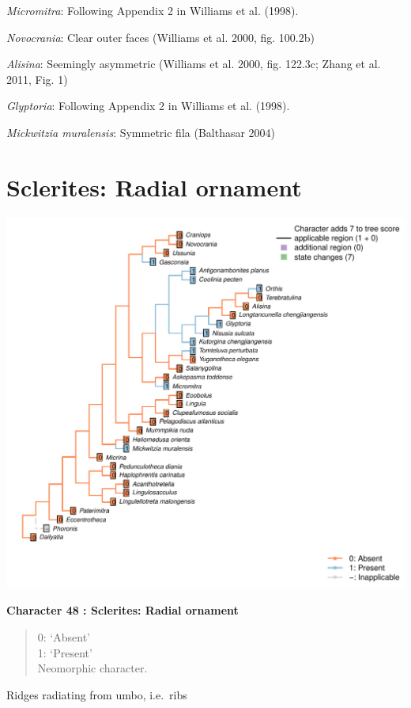 \documentclass[]{book}
\theoremstyle{definition}
\theoremstyle{definition}
\theoremstyle{definition}
\theoremstyle{remark}
\begin{document}
\emph{Micromitra}: Following Appendix 2 in Williams et al. (1998).

\emph{Novocrania}: Clear outer faces (Williams et al. 2000, fig. 100.2b)

\emph{Alisina}: Seemingly asymmetric (Williams et al. 2000, fig. 122.3c;
Zhang et al. 2011, Fig. 1)

\emph{Glyptoria}: Following Appendix 2 in Williams et al. (1998).

\emph{Mickwitzia muralensis}: Symmetric fila (Balthasar 2004)

\hypertarget{sclerites-radial-ornament}{%
\section*{Sclerites: Radial ornament}\label{sclerites-radial-ornament}}

\includegraphics{Brachiopod_phylogeny_files/figure-latex/unnamed-chunk-5-48.pdf}

\textbf{Character 48 : Sclerites: Radial ornament }

\begin{quote}
0: `Absent'\\
1: `Present'\\
Neomorphic character.
\end{quote}

Ridges radiating from umbo, i.e.~ribs
\end{document}
